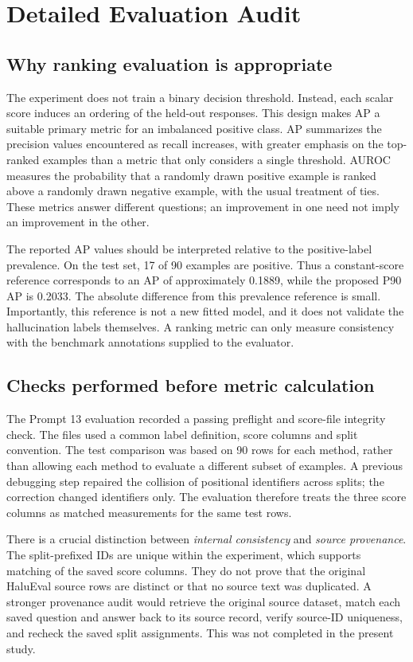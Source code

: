 \documentclass[manuscript,screen]{acmart}
\begin{document}
\section{Detailed Evaluation Audit}
\subsection{Why ranking evaluation is appropriate}
The experiment does not train a binary decision threshold. Instead, each scalar score induces an ordering of the held-out responses. This design makes AP a suitable primary metric for an imbalanced positive class. AP summarizes the precision values encountered as recall increases, with greater emphasis on the top-ranked examples than a metric that only considers a single threshold. AUROC measures the probability that a randomly drawn positive example is ranked above a randomly drawn negative example, with the usual treatment of ties. These metrics answer different questions; an improvement in one need not imply an improvement in the other.

The reported AP values should be interpreted relative to the positive-label prevalence. On the test set, 17 of 90 examples are positive. Thus a constant-score reference corresponds to an AP of approximately 0.1889, while the proposed P90 AP is 0.2033. The absolute difference from this prevalence reference is small. Importantly, this reference is not a new fitted model, and it does not validate the hallucination labels themselves. A ranking metric can only measure consistency with the benchmark annotations supplied to the evaluator.

\subsection{Checks performed before metric calculation}
The Prompt 13 evaluation recorded a passing preflight and score-file integrity check. The files used a common label definition, score columns and split convention. The test comparison was based on 90 rows for each method, rather than allowing each method to evaluate a different subset of examples. A previous debugging step repaired the collision of positional identifiers across splits; the correction changed identifiers only. The evaluation therefore treats the three score columns as matched measurements for the same test rows.

There is a crucial distinction between \emph{internal consistency} and \emph{source provenance}. The split-prefixed IDs are unique within the experiment, which supports matching of the saved score columns. They do not prove that the original HaluEval source rows are distinct or that no source text was duplicated. A stronger provenance audit would retrieve the original source dataset, match each saved question and answer back to its source record, verify source-ID uniqueness, and recheck the saved split assignments. This was not completed in the present study.
\end{document}
